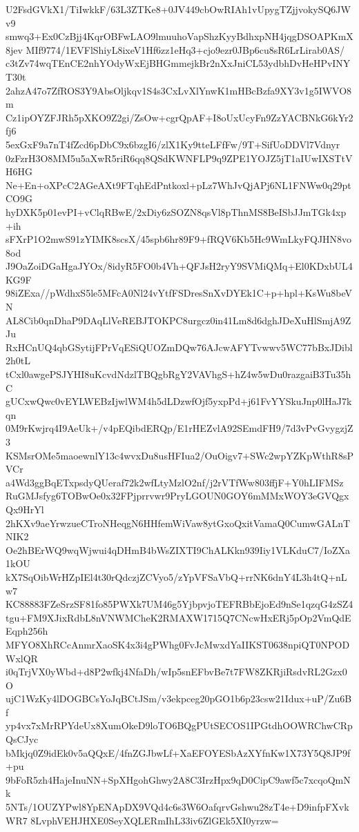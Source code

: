 U2FsdGVkX1/TiIwkkF/63L3ZTKe8+0JV449cbOwRIAh1vUpygTZjjvokySQ6JWv9
smwq3+Ex0CzBjj4KqrOBFwLAO9lmuuhoVapShzKyyBdhxpNH4jqgDSOAPKmX8jev
MIf9774/1EVFlShiyL8ixeV1Hf6zz1eHq3+cjo9ezr0JBp6cu8sR6LrLirab0AS/
c3tZv74wqTEnCE2nhYOdyWxEjBHGmmejkBr2nXxJniCL53ydbhDvHeHPvINYT30t
2ahzA47o7ZfROS3Y9AbsOljkqv1S4s3CxLvXlYnwK1mHBcBzfa9XY3v1g5IWVO8m
Cz1ipOYZFJRh5pXKO9Z2gi/ZsOw+cgrQpAF+I8oUxUcyFn9ZzYACBNkG6kYr2fj6
5exGxF9a7nT4fZcd6pDbC9x6bzgI6/zlX1Ky9tteLFfFw/9T+SifUoDDVl7Vdnyr
0zFzrH3O8MM5u5aXwR5riR6qq8QSdKWNFLP9q9ZPE1YOJZ5jT1aIUwIXSTtVH6HG
Ne+En+oXPcC2AGeAXt9FTqhEdPntkoxl+pLz7WhJvQjAPj6NL1FNWw0q29ptCO9G
hyDXK5p01evPI+vClqRBwE/2xDiy6zSOZN8qsVl8pThnMS8BeISbJJmTGk4xp+ih
sFXrP1O2mwS91zYIMK8scsX/45spb6hr89F9+fRQV6Kb5Hc9WmLkyFQJHN8vo8od
J9OaZoiDGaHgaJYOx/8idyR5FO0b4Vh+QFJsH2ryY9SVMiQMq+El0KDxbUL4KG9F
98iZExa//pWdhxS5le5MFcA0Nl24vYtfFSDresSnXvDYEk1C+p+hpl+KsWu8beVN
AL8Cib0qnDhaP9DAqLlVeREBJTOKPC8urgcz0in41Lm8d6dghJDeXuHlSmjA9ZJu
RxHCnUQ4qbGSytijFPrVqESiQUOZmDQw76AJcwAFYTvwwv5WC77bBxJDibl2h0tL
tCxl0awgePSJYHI8uKcvdNdzlTBQgbRgY2VAVhgS+hZ4w5wDu0razgaiB3Tu35hC
gUCxwQwc0vEYLWEBzIjwlWM4h5dLDzwfOjf5yxpPd+j61FvYYSkuJnp0lHaJ7kqn
0M9rKwjrq4I9AeUk+/v4pEQibdERQp/E1rHEZvlA92SEmdFH9/7d3vPvGvygzjZ3
KSMsrOMe5maoewnlY13c4wvxDu8usHFIua2/OuOigv7+SWc2wpYZKpWthR8sPVCr
a4Wd3ggBqETxpsdyQUeraf72k2wfLtyMzlO2nf/j2rVTfWw803ffjF+Y0hLIFMSz
RuGMJsfyg6TOBwOe0x32FPjprrvwr9PryLGOUN0GOY6mMMxWOY3eGVQgxQx9HrYl
2hKXv9aeYrwzueCTroNHeqgN6HHfemWiVaw8ytGxoQxitVamaQ0CumwGALnTNIK2
Oe2hBErWQ9wqWjwui4qDHmB4bWsZIXTI9ChALKkn939Iiy1VLKduC7/IoZXa1kOU
kX7SqOibWrHZpIEl4t30rQdczjZCVyo5/zYpVFSaVbQ+rrNK6dnY4L3h4tQ+nLw7
KC88883FZeSrzSF81fo85PWXk7UM46g5YjbpvjoTEFRBbEjoEd9nSe1qzqG4zSZ4
tgu+FM9XJixRdbL8nVNWMCheK2RMAXW1715Q7CNcwHxERj5pOp2VmQdEEqph256h
MFYO8XhRCcAnmrXaoSK4x3i4gPWhg0FvJcMwxdYaIIKST0638npiQT0NPODWxlQR
i0qTrjVX0yWbd+d8P2wfkj4NfaDh/wIp5snEFbvBe7t7FW8ZKRjiRsdvRL2Gzx0O
ujC1WzKy4lDOGBCsYoJqBCtJSm/v3ekpceg20pGO1b6p23csw21Idux+uP/Zu6Bf
yp4vx7xMrRPYdeUx8XumOkeD9loTO6BQgPUtSECOS1IPGtdhOOWRChwCRpQsCJyc
bMkjq0Z9idEk0v5aQQxE/4fnZGJbwLf+XaEFOYESbAzXYfnKw1X73Y5Q8JP9f+pu
9bFoR5zh4HajeInuNN+SpXHgohGhwy2A8C3IrzHpx9qD0CipC9awf5c7xcqoQmNk
5NTs/1OUZYPwl8YpENApDX9VQd4c6s3W6OafqrvGshwu28zT4e+D9infpFXvkWR7
8LvphVEHJHXE0SeyXQLERmIhL33iv6ZlGEk5XI0yrzw=
